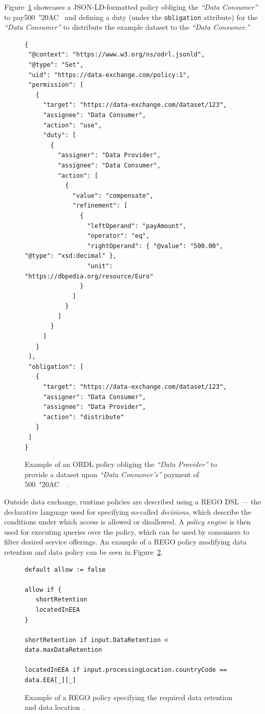 Figure~\ref{fig:ordl_example} showcases a JSON-LD-formatted policy obliging the \textit{``Data Consumer''} to pay500~\char"20AC~ and defining a duty (under the \texttt{obligation} attribute) for the \textit{``Data Consumer''} to distribute the example dataset to the \textit{``Data Consumer.''}

\begin{figure}
    \centering
    \begin{verbatim}
{
 "@context": "https://www.w3.org/ns/odrl.jsonld",
 "@type": "Set",
 "uid": "https://data-exchange.com/policy:1",
 "permission": [
   {
     "target": "https://data-exchange.com/dataset/123",
     "assignee": "Data Consumer",
     "action": "use",
     "duty": [
       {
         "assigner": "Data Provider",
         "assignee": "Data Consumer",
         "action": [
           {
             "value": "compensate",
             "refinement": [
               {
                 "leftOperand": "payAmount",
                 "operator": "eq",
                 "rightOperand": { "@value": "500.00", "@type": "xsd:decimal" },
                 "unit": "https://dbpedia.org/resource/Euro"
               }
             ]
           }
         ]
       }
     ]
   }
 ],
 "obligation": [
   {
     "target": "https://data-exchange.com/dataset/123",
     "assigner": "Data Consumer",
     "assignee": "Data Provider",
     "action": "distribute"
   }
 ]
}
    \end{verbatim}
    \caption{Example of an ORDL policy obliging the \textit{``Data Provider''} to provide a dataset upon \textit{``Data Consumer's''} payment of 500~\char"20AC~~\cite{gaiax_data_exchange_document}.}\label{fig:ordl_example}
\end{figure}

Outside data exchange, runtime policies are described using a REGO DSL --- the declarative language used for specifying so-called \textit{decisions}, which describe the conditions under which access is allowed or disallowed.
A \textit{policy engine} is then used for executing queries over the policy, which can be used by consumers to filter desired service offerings.
An example of a REGO policy modifying data retention and data policy can be seen in Figure~\ref{fig:rego_policy_example}.

\begin{figure}
    \centering
    \begin{verbatim}
default allow := false

allow if {
   shortRetention
   locatedInEEA
}

shortRetention if input.DataRetention < data.maxDataRetention

locatedInEEA if input.processingLocation.countryCode == data.EEA[_][_]
    \end{verbatim}
    \caption{Example of a REGO policy specifying the required data retention and data location~\cite{gaiax_compliance_as_a_code}.}\label{fig:rego_policy_example}
\end{figure}

